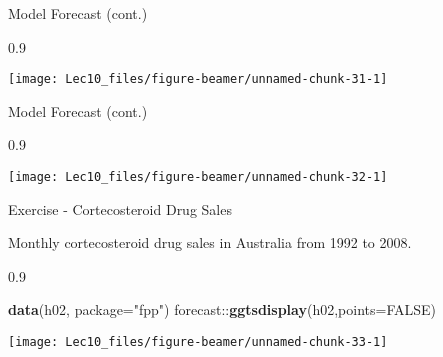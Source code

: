 \documentclass[11pt,ignorenonframetext,]{beamer}
\newenvironment{Shaded}{}{}
\newcommand{\DataTypeTok}[1]{\textcolor[rgb]{0.56,0.13,0.00}{#1}}
\newcommand{\DecValTok}[1]{\textcolor[rgb]{0.25,0.63,0.44}{#1}}
\newcommand{\FloatTok}[1]{\textcolor[rgb]{0.25,0.63,0.44}{#1}}
\newcommand{\KeywordTok}[1]{\textcolor[rgb]{0.00,0.44,0.13}{\textbf{#1}}}
\newcommand{\NormalTok}[1]{#1}
\newcommand{\OperatorTok}[1]{\textcolor[rgb]{0.40,0.40,0.40}{#1}}
\newcommand{\OtherTok}[1]{\textcolor[rgb]{0.00,0.44,0.13}{#1}}
\newcommand{\StringTok}[1]{\textcolor[rgb]{0.25,0.44,0.63}{#1}}
\let\oldShaded\Shaded
\let\endoldShaded\endShaded
\renewenvironment{Shaded}{\footnotesize\begin{spacing}{0.9}\oldShaded}{\endoldShaded\end{spacing}}
\begin{document}
\begin{frame}[fragile]{Model Forecast (cont.)}
\protect\hypertarget{model-forecast-cont.-1}{}

\begin{Shaded}
\end{Shaded}

\begin{center}\texttt{[image: Lec10\_files/figure-beamer/unnamed-chunk-31-1]} \end{center}

\end{frame}

\begin{frame}[fragile]{Model Forecast (cont.)}
\protect\hypertarget{model-forecast-cont.-2}{}

\begin{Shaded}
\end{Shaded}

\begin{center}\texttt{[image: Lec10\_files/figure-beamer/unnamed-chunk-32-1]} \end{center}

\end{frame}

\begin{frame}[fragile]{Exercise - Cortecosteroid Drug Sales}
\protect\hypertarget{exercise---cortecosteroid-drug-sales}{}

Monthly cortecosteroid drug sales in Australia from 1992 to 2008.

\begin{Shaded}
\begin{Highlighting}[]
\KeywordTok{data}\NormalTok{(h02, }\DataTypeTok{package=}\StringTok{"fpp"}\NormalTok{)}
\NormalTok{forecast}\OperatorTok{::}\KeywordTok{ggtsdisplay}\NormalTok{(h02,}\DataTypeTok{points=}\OtherTok{FALSE}\NormalTok{)}
\end{Highlighting}
\end{Shaded}

\begin{center}\texttt{[image: Lec10\_files/figure-beamer/unnamed-chunk-33-1]} \end{center}

\end{frame}
\end{document}
